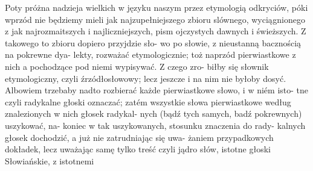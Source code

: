 Poty próżna nadzieja wielkich w języku naszym przez
etymologią odkryciów, póki wprzód nie będziemy mieli jak
najzupełniejszego zbioru slównego, wyciągnionego z jak
najrozmaitszych i najliczniejszych, pism ojczystych dawnych
i świeższych. Z takowego to zbioru dopiero przyjdzie sło-
wo po słowie, z nieustanną bacznością na pokrewne dya-
lekty, rozważać etymologicznie; toż naprzód pierwiastkowe
z nich a pochodzące pod niemi wypisywać. Z czego zro-
biłby się słownik etymologiczny, czyli źrzódłosłowowy; lecz
jeszcze i na nim nie byłoby dosyć. Albowiem trzebaby
nadto rozbierać każde pierwiastkowe słowo, i w niém isto-
tne czyli radykalne głoski oznaczać; zatém wszystkie słowa
pierwiastkowe według znalezionych w nich głosek radykal-
nych (bądź tych samych, badź pokrewnych) uszykować, na-
koniec w tak uszykowanych, stosunku znaczenia do rady-
kalnych głosek dochodzić, a już nie zatrudniając się uwa-
żaniem przypadkowych dokładek, lecz uważając samę tylko
treść czyli jądro słów, istotne głoski Słowiańskie, z istotnemi 



